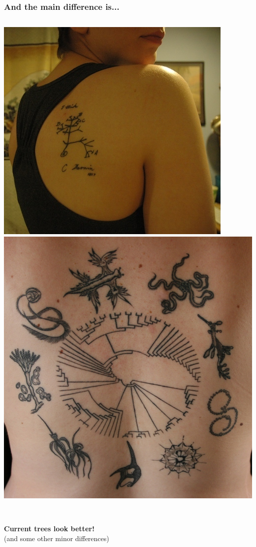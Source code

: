 \documentclass[Xcolor=svgnames,mathserif]{beamer}
\begin{document}
\begin{frame}
  \frametitle{And the main difference is...}

\pause
\begin{columns}[c]
	\includegraphics[width=.9\textwidth]{figs/tattooDarwin}\\
	\includegraphics[width=.8\textwidth]{figs/tattooNew}\\
\end{columns}
~\\
\centering
\textbf{Current trees look better!}
\pause
~\\

\vspace{.5cm}
\alert{(and some other minor differences)}

\end{frame}
\end{document}
